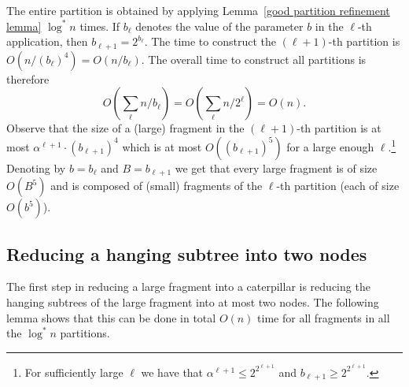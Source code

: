 \documentclass[a4paper,UKenglish]{lipics-v2016}
\theoremstyle{plain}
\begin{document}
\noindent The entire partition is obtained by applying Lemma~\ref{good partition refinement lemma} $\log^{*}n$ times. 
If $b_{\ell}$ denotes the value of the parameter $b$ in the $\ell$-th application, then  $b_{\ell+1}=2^{b_{\ell}}$. The time to construct the $(\ell+1)$-th partition is $O(n/(b_{\ell})^{4})=O(n/b_{\ell})$. The overall time to construct all partitions is therefore 
$$ O(\sum_{\ell} {n}/{b_{\ell}}) = O(\sum_{\ell} {n}/{2^{\ell}}) = O(n).$$
Observe that the size of a (large) fragment in the $(\ell+1)$-th partition is at most $\alpha^{\ell+1} \cdot (b_{\ell+1})^{4}$ which is at most $O((b_{\ell+1})^5)$ for a large enough $\ell$.\footnote{For sufficiently large $\ell$ we have that $\alpha^{\ell+1}\leq 2^{2^{\ell+1}}$ and $b_{\ell+1}\geq 2^{2^{\ell+1}}$.}  Denoting by $b=b_{\ell}$ and $B=b_{\ell+1}$  we get that every large fragment is of size $O(B^5)$ and is composed of (small) fragments of the $\ell$-th partition (each of size $O(b^5)$). 








\subsection{Reducing a hanging subtree into two nodes}\label{section:lemma1}
The first step in reducing a large fragment into a caterpillar is reducing the hanging subtrees of the large fragment into at most two nodes. The following lemma shows that this can be done in total $O(n)$ time for all fragments in all the $\log^* n$ partitions.
\end{document}
